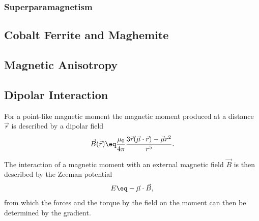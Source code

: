 \documentclass[\main/dresen_thesis.tex]{subfiles}
\begin{document}
  \subsubsection{Superparamagnetism}

  \subsection{Cobalt Ferrite and Maghemite}

  \subsection{Magnetic Anisotropy}

  \subsection{Dipolar Interaction}
  For a point-like magnetic moment the magnetic moment produced at a distance $\vec{r}$ is described by a dipolar field
  \begin{align}
    \vec{B}(\vec{r}) \eq \frac{\mu_0}{4 \pi} \frac{3 \vec{r} (\vec{\mu} \cdot \vec{r}) - \vec{\mu} r^2}{r^5}.
  \end{align}

  The interaction of a magnetic moment with an external magnetic field  $\vec{B}$ is then described by the Zeeman potential
  \begin{align}
    E \eq - \vec{\mu} \cdot \vec{B},
  \end{align}
  from which the forces and the torque by the field on the moment can then be determined by the gradient.
  \FloatBarrier
\end{document}
